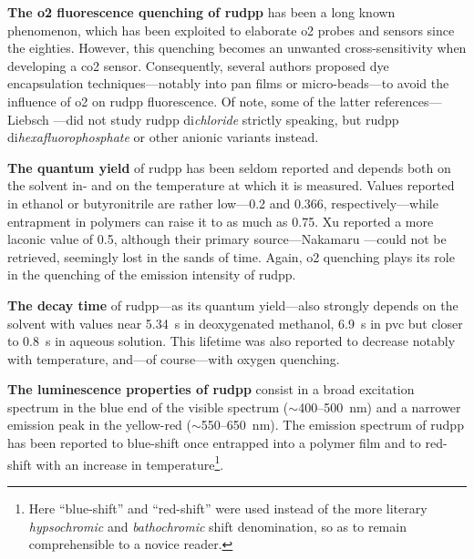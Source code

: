 \textbf{The \gls{o2} fluorescence quenching of \gls{rudpp}} has been a long known phenomenon, which has been exploited to elaborate \gls{o2} probes and sensors since the eighties\cite{bacon1987, baker2000, xu1994, mills2013}. However, this quenching becomes an unwanted cross-sensitivity when developing a \gls{co2} sensor. Consequently, several authors proposed dye encapsulation techniques---notably into \gls{pan} films or micro-beads\cite{liebsch1999, bultzingslowen2002, burke2006, cajlakovic2006}---to avoid the influence of \gls{o2} on \gls{rudpp} fluorescence. Of note, some of the latter references---\eg{} Liebsch \etal{}\cite{liebsch1999}---did not study \gls{rudpp} di\emph{chloride} strictly speaking, but \gls{rudpp} di\emph{hexafluorophosphate} or other anionic variants instead.

\textbf{The quantum yield} of \gls{rudpp} has been seldom reported and depends both on the solvent in- and on the temperature at which it is measured. Values reported in ethanol\cite{alford1985} or butyronitrile\cite{kapturkiewicz1995} are rather low---0.2 and 0.366, respectively---while entrapment in polymers can raise it to as much as 0.75\cite{alford1985}. Xu \etal{}\cite{xu1994} reported a more laconic value of 0.5, although their primary source---Nakamaru \etal{}\cite{nakamaru1979}---could not be retrieved, seemingly lost in the sands of time. Again, \gls{o2} quenching plays its role in the quenching of the emission intensity of \gls{rudpp}\cite{mills2013}.

\textbf{The decay time} of \gls{rudpp}---as its quantum yield---also strongly depends on the solvent with values near 5.34~\textmu{}s in deoxygenated methanol\cite{demas1977}, 6.9~\textmu{}s in \gls{pvc}\cite{alford1985} but closer to 0.8~\textmu{}s in aqueous solution\cite{liebsch1999}. This lifetime was also reported to decrease notably with temperature\cite{bacon1987, liebsch1999}, and---of course---with oxygen quenching\cite{bacon1987}.

\textbf{The luminescence properties of \gls{rudpp}} consist in a broad excitation spectrum in the blue end of the visible spectrum ($\sim$400--500~nm) and a narrower emission peak in the yellow-red ($\sim$550--650~nm). The emission spectrum of \gls{rudpp} has been reported to blue-shift once entrapped into a polymer film\cite{alford1985} and to red-shift with an increase in temperature\cite{baker2000}\footnote{Here \enquote{blue-shift} and \enquote{red-shift} were used instead of the more literary \emph{hypsochromic} and \emph{bathochromic} shift denomination, so as to remain comprehensible to a novice reader.}.

